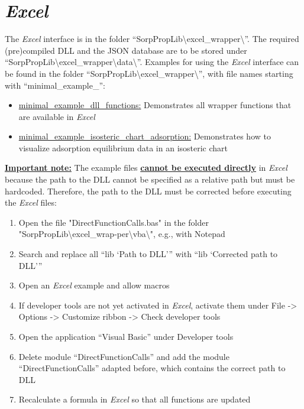 \section{\textit{Excel}}
\label{cha:usage:excel}
%
The \textit{Excel} interface is in the folder “SorpPropLib\textbackslash excel\_wrapper\textbackslash ”. The required (pre)compiled DLL and the JSON database are to be stored under “SorpPropLib\textbackslash excel\_wrapper\textbackslash data\textbackslash”. Examples for using the \textit{Excel} interface can be found in the folder “SorpPropLib\textbackslash excel\_wrapper\textbackslash ”, with file names starting with “minimal\_example\_”:
\begin{itemize}
	\item \underline{minimal\_example\_dll\_functions:} Demonstrates all wrapper functions that are available in \textit{Excel}
	\item \underline{minimal\_example\_isosteric\_chart\_adsorption:} Demonstrates how to visualize adsorption equilibrium data in an isosteric chart
\end{itemize}
\textbf{\underline{Important note:}} The example files \textbf{\underline{cannot be executed directly}} in \textit{Excel} because the path to the DLL cannot be specified as a relative path but must be hardcoded. Therefore, the path to the DLL must be corrected before executing the \textit{Excel} files:
\begin{enumerate}
	\item Open the file "DirectFunctionCalls.bas" in the folder "SorpPropLib\textbackslash excel\_wrap-per\textbackslash vba\textbackslash ", e.g., with Notepad
	\item Search and replace all “lib ‘Path to DLL’” with “lib ‘Corrected path to DLL’”
	\item Open an \textit{Excel} example and allow macros
	\item If developer tools are not yet activated in \textit{Excel}, activate them under File -> Options -> Customize ribbon -> Check developer tools
	\item Open the application “Visual Basic” under Developer tools
	\item Delete module “DirectFunctionCalls” and add the module “DirectFunctionCalls” adapted before, which contains the correct path to DLL
	\item Recalculate a formula in \textit{Excel} so that all functions are updated
\end{enumerate}
